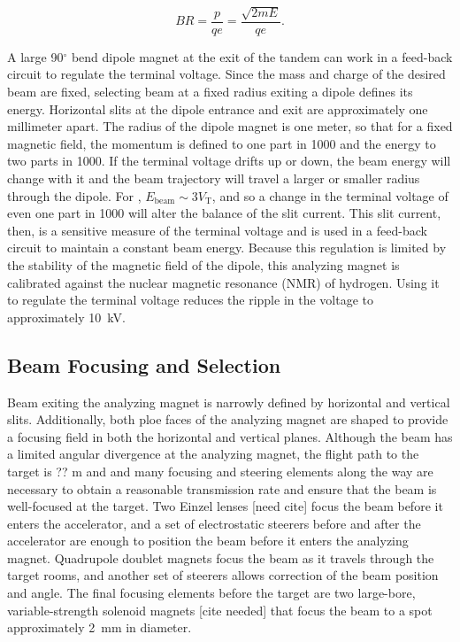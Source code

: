 \begin{equation}
BR = \frac{p}{qe} = \frac{\sqrt{2mE}}{qe}.
\label{eqn:rigidity}
\end{equation}

A large 90$^{\circ}$ bend dipole magnet at the exit of the tandem can work in a feed-back circuit to regulate the terminal voltage.  Since the mass and charge of the desired beam are fixed, selecting beam at a fixed radius exiting a dipole defines its energy.  Horizontal slits at the dipole entrance and exit are approximately one millimeter apart.  The radius of the dipole magnet is one meter, so that for a fixed magnetic field, the momentum is defined to one part in 1000 and the energy to two parts in 1000.  If the terminal voltage drifts up or down, the beam energy will change with it and the beam trajectory will travel a larger or smaller radius through the dipole.  For , $E_{\text{beam}}\sim3V_{\text{T}}$, and so a change in the terminal voltage of even one part in 1000 will alter the balance of the slit current.  This slit current, then, is a sensitive measure of the terminal voltage and is used in a feed-back circuit to maintain a constant beam energy.  Because this regulation is limited by the stability of the magnetic field of the dipole, this analyzing magnet is calibrated against the nuclear magnetic resonance (NMR) of hydrogen.  Using it to regulate the terminal voltage reduces the ripple in the voltage to approximately 10~kV.


\subsection{Beam Focusing and Selection}

Beam exiting the analyzing magnet is narrowly defined by horizontal and vertical slits.  Additionally, both ploe faces of the analyzing magnet are shaped to provide a focusing field in both the horizontal and vertical planes.  Although the beam has a limited angular divergence at the analyzing magnet, the flight path to the target is ?? m and and many focusing and steering elements along the way are necessary to obtain a reasonable transmission rate and ensure that the beam is well-focused at the target.  Two Einzel lenses [need cite] focus the beam before it enters the accelerator, and a set of electrostatic steerers before and after the accelerator are enough to position the beam before it enters the analyzing magnet.  Quadrupole doublet magnets focus the beam as it travels through the target rooms, and another set of steerers allows correction of the beam position and angle.  The final focusing elements before the target are two large-bore, variable-strength solenoid magnets [cite needed] that focus the beam to a spot approximately 2~mm in diameter.

